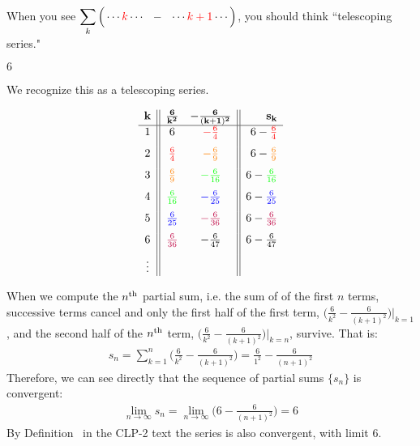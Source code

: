 \begin{hint}
When you see $\displaystyle\sum_k \Big(\cdots \textcolor{red}{k}\cdots \ \ -\ \ \cdots \textcolor{red}{k+1}\cdots\Big)$,
you should  think ``telescoping series."
\end{hint}

\begin{answer}
$6$
\end{answer}

\begin{solution}
We recognize this as a telescoping series.

\[\begin{array}{c||cc||r}
\mathbf{k}&\mathbf{\frac{6}{k^2}}&\mathbf{-\frac{6}{(k+1)^2}}&\mathbf{s_k}\\
\hline
1&6&\color{red}-\frac{6}{4}&6-\color{red}\frac64\\[7pt]
2&\color{red}\frac{6}{4}&\color{orange}-\frac{6}{9}&6-\color{orange}\frac69\\[7pt]
3&\color{orange}\frac{6}{9}&\color{green}-\frac{6}{16}&6-\color{green}\frac{6}{16}\\[7pt]
4&\color{green}\frac{6}{16}&\color{blue}-\frac{6}{25}&6-\color{blue}\frac{6}{25}\\[7pt]
5&\color{blue}\frac{6}{25}&\color{purple}-\frac{6}{36}&6-\color{purple}\frac{6}{36}\\[7pt]
6&\color{purple}\frac{6}{36}&-\frac{6}{47}&6-\frac{6}{47}\\[7pt]
\vdots&&&
\end{array}\]

When we compute  the $n^{\rm th}$
partial sum, i.e. the sum of of the first $n$ terms, successive terms cancel and only
the first half of the first term, $\Big( \frac{6}{k^2} - \frac{6}{(k+1)^2} \Big)\Big|_{k=1}$,
and the second half of the $n^{\rm th}$ term,
$\Big( \frac{6}{k^2} - \frac{6}{(k+1)^2} \Big)\Big|_{k=n}$, survive. That is:
\begin{align*}
s_n = \sum_{k=1}^{n} \bigg( \frac{6}{k^2} - \frac{6}{(k+1)^2} \bigg)
      = \frac6{1^2} - \frac{6}{(n+1)^2}
\end{align*}
Therefore, we can see directly that the sequence of partial sums $\{ s_n \}$ is convergent:
\begin{align*}
\lim_{n\to\infty} s_n = \lim_{n\to\infty}  \bigg( 6- \frac{6}{(n+1)^2} \bigg) = 6
\end{align*}
By Definition~ in the CLP-2 text the series is also convergent, with limit $6$.

\end{solution}

